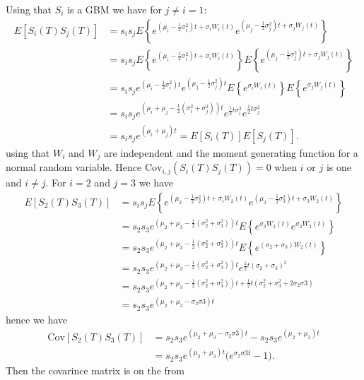 \documentclass[
]{book}
\begin{document}
Using that \(S_i\) is a GBM we have for \(j\ne i=1\):
\begin{align*}
E[S_i(T)S_j(T)]&=s_is_jE\left\{e^{\left(\mu_i-\frac{1}{2}\sigma_i^2\right)t+\sigma_i W_i(t)}e^{\left(\mu_j-\frac{1}{2}\sigma_j^2\right)t+\sigma_j W_j(t)}\right\}\\
&=s_is_jE\left\{e^{\left(\mu_i-\frac{1}{2}\sigma_i^2\right)t+\sigma_i W_i(t)}\right\}E\left\{e^{\left(\mu_j-\frac{1}{2}\sigma_j^2\right)t+\sigma_j W_j(t)}\right\}\\
&=s_is_je^{\left(\mu_i-\frac{1}{2}\sigma_i^2\right)t}e^{\left(\mu_j-\frac{1}{2}\sigma_j^2\right)t}E\left\{e^{\sigma_i W_i(t)}\right\}E\left\{e^{\sigma_j W_j(t)}\right\}\\
&=s_is_je^{\left(\mu_i+\mu_j-\frac{1}{2}(\sigma_i^2+\sigma_j^2)\right)t}e^{\frac{1}{2}t\sigma_i^2}e^{\frac{1}{2}t\sigma_j^2}\\
&=s_is_je^{\left(\mu_i+\mu_j\right)t}=E[S_i(T)]E[S_j(T)].
\end{align*}
using that \(W_i\) and \(W_j\) are independent and the moment generating function for a normal random variable. Hence \(\text{Cov}_{i,j}(S_i(T)S_j(T))=0\) when \(i\) or \(j\) is one and \(i\ne j\). For \(i=2\) and \(j=3\) we have
\begin{align*}
E[S_2(T)S_3(T)]&=s_is_jE\left\{e^{\left(\mu_2-\frac{1}{2}\sigma_2^2\right)t+\sigma_i W_2(t)}e^{\left(\mu_3-\frac{1}{2}\sigma_3^2\right)t+\sigma_3 W_2(t)}\right\}\\
&=s_2s_3e^{\left(\mu_2+\mu_3-\frac{1}{2}(\sigma_2^2+\sigma_3^2)\right)t}E\left\{e^{\sigma_3 W_2(t)}e^{\sigma_3 W_2(t)}\right\}\\
&=s_2s_3e^{\left(\mu_2+\mu_3-\frac{1}{2}(\sigma_2^2+\sigma_3^2)\right)t}E\left\{e^{(\sigma_2 +\sigma_3 )W_2(t)}\right\}\\
&=s_2s_3e^{\left(\mu_2+\mu_3-\frac{1}{2}(\sigma_2^2+\sigma_3^2)\right)t}e^{\frac{1}{2}t(\sigma_2 +\sigma_3 )^2}\\
&=s_2s_3e^{\left(\mu_2+\mu_3-\frac{1}{2}(\sigma_2^2+\sigma_3^2)\right)t+\frac{1}{2}t(\sigma_2^2 +\sigma_3^2+2\sigma_2\sigma3 )}\\
&=s_2s_3e^{\left(\mu_2+\mu_3-\sigma_2\sigma3\right)t}
\end{align*}
hence we have
\begin{align*}
\text{Cov}[S_2(T)S_3(T)]&=s_2s_3e^{\left(\mu_2+\mu_3-\sigma_2\sigma3\right)t}-s_2s_3e^{(\mu_2+\mu_3)t}\\
&=s_2s_3e^{(\mu_2+\mu_3)t}\Big(e^{\sigma_2\sigma3t}-1\Big).
\end{align*}
Then the covarince matrix is on the from
\end{document}

